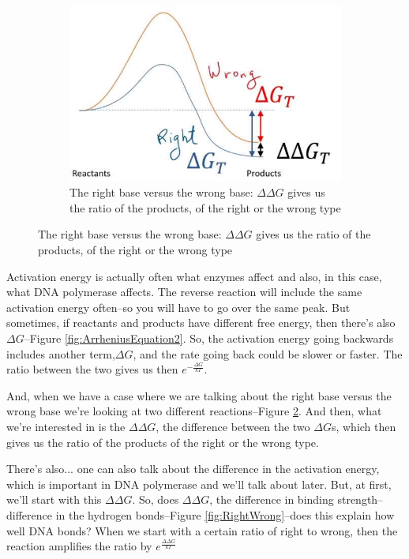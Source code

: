 \documentclass[]{article}
\begin{document}
\begin{figure}[H]
\begin{subfigure}[t]{0.3\textwidth}
	\end{subfigure}
	\;
	\begin{subfigure}[t]{0.3\textwidth}
		\caption{The right base versus the wrong base: $\Delta \Delta G$ gives us the ratio of the products, of the right or the wrong type}\label{fig:ArrheniusEquation3}
		\includegraphics[width=\textwidth]{ArrheniusEquation3}
	\end{subfigure}
\end{figure}


Activation energy is actually often what enzymes affect and also, in this case, what DNA polymerase affects. The reverse reaction will include the same activation energy often--so you will have to go over the same peak. But sometimes, if reactants and products
have different free energy, then there's also $\Delta G$--Figure \ref{fig:ArrheniusEquation2}. So, the activation energy going backwards includes another term,$\Delta G$, and the rate going back could be slower or faster. The ratio between the two gives us then $e^{-\frac{\Delta G}{kT}}$.

And, when we have a case where we are talking about the right base versus the wrong base
we're looking at two different reactions--Figure \ref{fig:ArrheniusEquation3}.
And then, what we're interested in is the $\Delta \Delta G$,
the difference between the two $\Delta G$s, which then gives us the ratio of the products
of the right or the wrong type.

There's also... one can also talk about
the difference in the activation energy,
which is important in DNA polymerase
and we'll talk about later.
But, at first, we'll start with
this $\Delta \Delta G$.
So, does $\Delta \Delta G$,
the difference in binding strength--
difference in the hydrogen bonds--Figure \ref{fig:RightWrong}--does this explain how well DNA bonds? When we start with a certain ratio of right to wrong, then the reaction amplifies the ratio by $e^\frac{\Delta \Delta G}{kT}$
\end{document}
